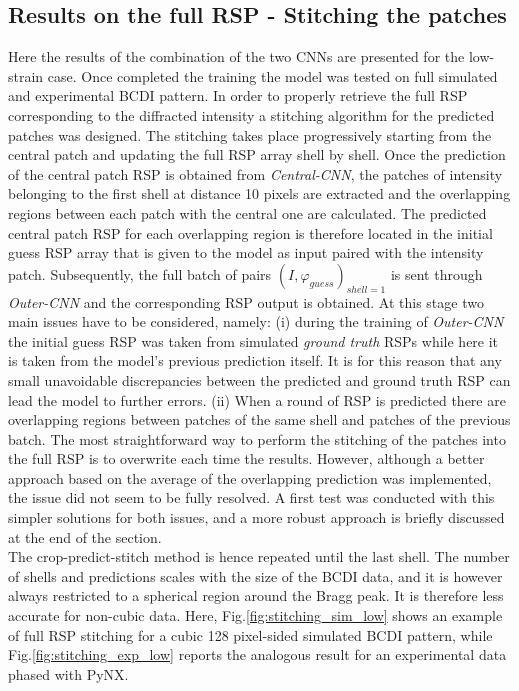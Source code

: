 \subsection{Results on the full RSP - Stitching the patches}

Here the results of the combination of the two CNNs are presented for the low-strain case. Once completed the training 
the model was tested on full simulated and experimental BCDI pattern. In order to properly retrieve the full RSP corresponding 
to the diffracted intensity a stitching algorithm for the predicted patches was designed. The stitching takes place
progressively starting from the central patch and updating the full RSP array shell by shell. Once the prediction of the 
central patch RSP is obtained from \textit{Central-CNN}, the patches of intensity belonging to the first shell at distance 10 pixels 
are extracted and the overlapping regions between each patch with the central one are calculated. The predicted central patch RSP 
for each overlapping region is therefore located in the initial guess RSP array that is given to the model as input paired with 
the intensity patch. Subsequently, the full batch of pairs $(I,\varphi_{guess})_{shell = 1}$ is sent through 
\textit{Outer-CNN} and the corresponding RSP output is obtained. 
At this stage two main issues have to be considered, namely: (i) during the training of \textit{Outer-CNN}
the initial guess RSP was taken from simulated \textit{ground truth} RSPs while here it is taken from the model's 
previous prediction itself. It is for this reason that any small unavoidable discrepancies between the predicted and 
ground truth RSP can lead the model to further errors. (ii) When a round of RSP is predicted there are overlapping 
regions between patches of the same shell and patches of the previous batch. The most straightforward way to perform the 
stitching of the patches into the full RSP is to overwrite each time the results. However, although a better approach 
based on the average of the overlapping prediction was implemented, the issue did not seem to be fully resolved.
A first test was conducted with this simpler solutions for both issues, and a more robust approach is briefly discussed 
at the end of the section. \\

The crop-predict-stitch method is hence repeated until the last shell. The number of shells and predictions scales with 
the size of the BCDI data, and it is however always restricted to a spherical region around the Bragg peak. It is therefore 
less accurate for non-cubic data. 
Here, Fig.\ref{fig:stitching_sim_low} shows an example of full RSP stitching for a cubic 128 pixel-sided simulated BCDI 
pattern, while Fig.\ref{fig:stitching_exp_low} reports the analogous result for an experimental data phased with PyNX. 

